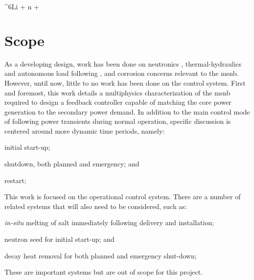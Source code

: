 \begin{reaction} \label{rxn:tritium}
    ^{6}Li + n  + \alpha
\end{reaction}

\section{Scope}
As a developing design, work has been done on neutronics \cite{PetersonMS}, thermal-hydraulics and autonomous load following \cite{CarterPHD}, and corrosion concerns \cite{RoperPHD} relevant to the \acs{msnb}. However, until now, little to no work has been done on the control system. First and foremost, this work details a multiphysics characterization of the \acs{msnb} required to design a feedback controller capable of matching the core power generation to the secondary power demand. In addition to the main control mode of following power transients during normal operation, specific discussion is centered around more dynamic time periods, namely: 
\begin{enumerate*}
    \item initial start-up;
    \item shutdown, both planned and emergency; and
    \item restart;
\end{enumerate*}

This work is focused on the operational control system. There are a number of related systems that will also need to be considered, such as: 
\begin{enumerate*}
    \item \textit{in-situ} melting of salt immediately following delivery and installation;
    \item neutron seed for initial start-up; and
    \item decay heat removal for both planned and emergency shut-down;
\end{enumerate*}
These are important systems but are out of scope for this project.

\begin{comment}
\section{Outline}
This report will begin by discussing the field of process control engineering, specifically the control methods which are most useful in the design of a controller for the \acs{msnb}, and the challenges inherent to a controlling a nuclear chain reaction, both in normal operational modes and special cases. The reactor will then be characterized, using a combination of stochastic neutron transport code to define the reactivity curve of the control drums and finite element process simulation to understand the reactivity feedback effects intrinsic to the design. The resulting model of the reactor will then be used to design and tune the controller, which will then be tested against the reactor's autonomous response to load demand changes. Finally, after the results of the simulation are analyzed, the limitations of this method, as well as future work that will be required to implement a \acl{msnb} will be discussed.   
\end{comment}